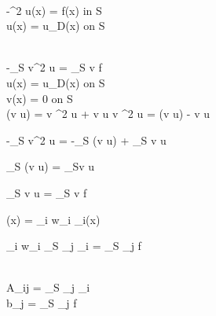 \\
-\nabla^2 u(x) = f(x) \textrm{ in } S\\
u(x) = u_D(x) \textrm{ on } \partial S


\\
-\int_S v\nabla^2 u = \int_S v f\\
u(x) = u_D(x) \textrm{ on } \partial S\\
v(x) = 0 \textrm{ on } \partial S\\

\nabla(v \cdot \nabla u) = v \nabla^2 u + \nabla v \cdot \nabla u \rightarrow
 v \nabla^2 u  = \nabla(v \cdot \nabla u) - \nabla v \cdot \nabla u

-\int_S v\nabla^2 u = -\int_S \nabla(v \cdot \nabla u) + \int_S \nabla v \cdot \nabla u

\int_S \nabla(v \cdot \nabla u) = \int_{\partial S}v \cdot \nabla u

\int_S \nabla v \cdot \nabla u = \int_S v f

(x) = \sum_i w_i _i(x)

\sum_i w_i \int_S \nabla {}_j \cdot \nabla {}_i = \int_S _j f

\\
A_{ij} = \int_S \nabla {}_j \cdot \nabla {}_i\\
b_j = \int_S  _j f
